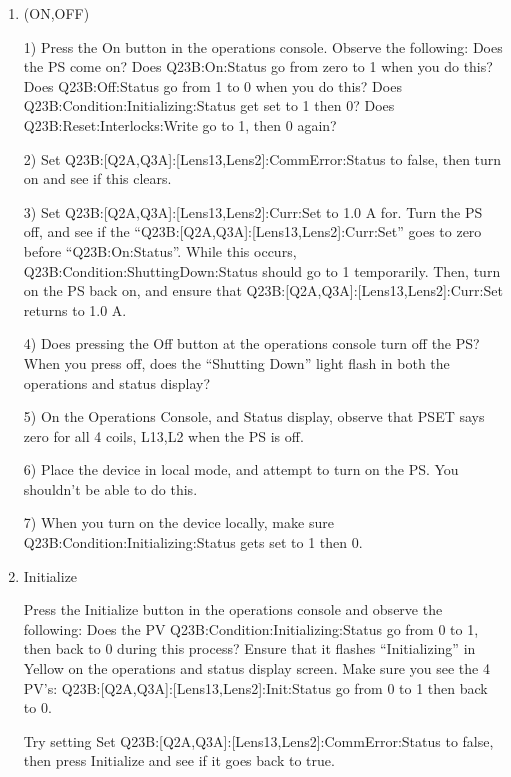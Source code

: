 \documentclass[11pt]{book}		%
\begin{document}
\begin{enumerate}
 
\item (ON,OFF) 

\color{red}
1) Press the On button in the operations console. Observe the following: 
	Does the PS come on? 
	Does Q23B:On:Status go from zero to 1 when you do this? 
	Does Q23B:Off:Status go from 1 to 0 when you do this? 
	Does Q23B:Condition:Initializing:Status get set to 1 then 0?
	Does Q23B:Reset:Interlocks:Write go to 1, then 0 again?

2) Set Q23B:[Q2A,Q3A]:[Lens13,Lens2]:CommError:Status to false, then turn on and see if this clears.

3) Set Q23B:[Q2A,Q3A]:[Lens13,Lens2]:Curr:Set to 1.0 A for. Turn the PS off, and see if the ``Q23B:[Q2A,Q3A]:[Lens13,Lens2]:Curr:Set'' goes to zero before ``Q23B:On:Status''. While this occurs, Q23B:Condition:ShuttingDown:Status should go to 1 temporarily. Then, turn on the PS back on, and ensure that Q23B:[Q2A,Q3A]:[Lens13,Lens2]:Curr:Set returns to 1.0 A.

4) Does pressing the Off button at the operations console turn off the PS? When you press off, does the ``Shutting Down'' light flash in both the operations and status display?

5) On the Operations Console, and Status display, observe that PSET says zero for all 4 coils, L13,L2 when the PS is off.

6) Place the device in local mode, and attempt to turn on the PS. You shouldn't be able to do this.

7) When you turn on the device locally, make sure Q23B:Condition:Initializing:Status gets set to 1 then 0.


\color{black}

 \item Initialize

\color{red}

Press the Initialize button in the operations console and observe the following: 
	Does the PV Q23B:Condition:Initializing:Status go from 0 to 1, then back to 0 during this process? 
	Ensure that it flashes ``Initializing'' in Yellow on the operations and status display screen. 
	Make sure you see the 4 PV's: Q23B:[Q2A,Q3A]:[Lens13,Lens2]:Init:Status go from 0 to 1 then back to 0.

Try setting Set Q23B:[Q2A,Q3A]:[Lens13,Lens2]:CommError:Status to false, then press Initialize and see if it goes back to true.


\color{black}


\end{enumerate}
\end{document}
